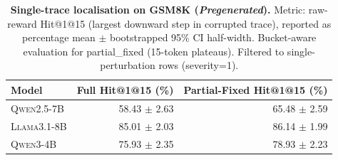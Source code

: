 \begin{table}[t]
\centering
\small
\renewcommand{\arraystretch}{1.08}
\begin{tabular}{l r r}
\toprule
\textbf{Model} & \textbf{Full Hit@1@15 (\%)} & \textbf{Partial-Fixed Hit@1@15 (\%)} \\
\midrule
\textsc{Qwen2.5-7B} & 58.43 $\pm$ 2.63 & 65.48 $\pm$ 2.59 \\
\textsc{Llama3.1-8B} & 85.01 $\pm$ 2.03 & 86.14 $\pm$ 1.99 \\
\textsc{Qwen3-4B} & 75.93 $\pm$ 2.35 & 78.93 $\pm$ 2.23 \\
\bottomrule
\end{tabular}
\caption{\textbf{Single-trace localisation on GSM8K (\textit{Pregenerated}).} Metric: raw-reward Hit@1@15 (largest downward step in corrupted trace), reported as percentage mean $\pm$ bootstrapped 95\% CI half-width. Bucket-aware evaluation for partial_fixed (15-token plateaus). Filtered to single-perturbation rows (severity=1).}
\label{tab:localisation_hit1at15_pregenerated_full_vs_partial_raw}
\end{table}